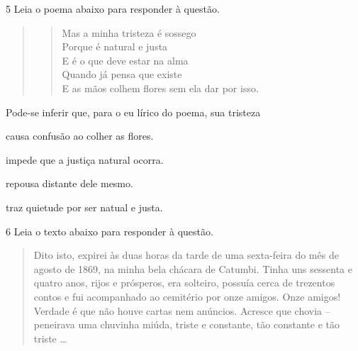 \num{5} Leia o poema abaixo para responder à questão. 

\begin{quote}
\begin{verse}

Mas a minha tristeza é sossego \\
Porque é natural e justa \\
E é o que deve estar na alma \\
Quando já pensa que existe \\
E as mãos colhem flores sem ela dar por isso.

\end{verse}
\end{quote}


Pode-se inferir que, para o eu lírico do poema, sua tristeza

\begin{escolha}

    \item causa confusão ao colher as flores.

    \item impede que a justiça natural ocorra.

    \item repousa distante dele mesmo. 

    \item traz quietude por ser natual e justa. 

\end{escolha}

\num{6} Leia o texto abaixo para responder à questão. 


\begin{quote}

Dito isto, expirei às duas horas da tarde de uma
sexta-feira do mês de agosto de 1869, na minha bela
chácara de Catumbi. Tinha uns sessenta e quatro anos,
rijos e prósperos, era solteiro, possuía cerca de trezentos
contos e fui acompanhado ao cemitério por onze amigos.
Onze amigos! Verdade é que não houve cartas nem
anúncios. Acresce que chovia -- peneirava uma chuvinha
miúda, triste e constante, tão constante e tão triste \ldots{}

\end{quote}

